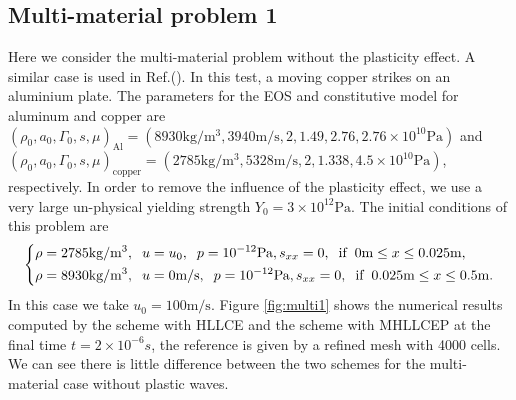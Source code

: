 \documentclass[review]{elsarticle}
\begin{document}
    \subsection{Multi-material problem 1}\label{pro:multi1}
  Here we consider the multi-material problem without the plasticity effect. A similar case is used in Ref.(\cite{ghaisas2016high}). In this test, a moving  copper strikes on an aluminium plate. The parameters for the EOS and constitutive model for aluminum and copper  are
$ (\rho_0, a_0, \Gamma_0, s, \mu)_{\text{Al}} =(8930 \text{kg}/\text{m}^3, 3940 \text{m}/\text{s},2, 1.49, 2.76 ,2.76\times 10^{10} \text{Pa} )$ and   $(\rho_0, a_0, \Gamma_0, s, \mu)_{\text{copper}} =(2785 \text{kg}/\text{m}^3, 5328 \text{m}/\text{s},2, 1.338,4.5\times 10^{10}\text{Pa})$, respectively. In order to remove the influence of the plasticity effect, we use a very large un-physical yielding strength $Y_0 = 3\times 10^{12} \text{Pa}$.  The initial conditions of this problem are
\begin{equation}\label{eq:initmulti}
  \left\{ \begin{aligned}
    & \rho = 2785 \text{kg}/\text{m}^3, \hspace{0.2cm} u = u_0, \hspace{0.2cm} p = 10^{-12}\text{Pa}, s_{xx} = 0, \hspace{0.2cm} \text{if} \hspace{0.2cm} 0\text{m} \le x \le 0.025 \text{m},\\
    &  \rho = 8930 \text{kg}/\text{m}^3, \hspace{0.2cm} u = 0\text{m}/\text{s}, \hspace{0.2cm} p = 10^{-12}\text{Pa}, s_{xx} = 0, \hspace{0.2cm} \text{if} \hspace{0.2cm} 0.025\text{m} \le x \le 0.5 \text{m}.\\
    \end{aligned}
  \right.
\end{equation}
In this case we take $u_0 = 100 \text{m}/\text{s}$. Figure \ref{fig:multi1}  shows  the numerical results computed by the scheme with HLLCE and the scheme with MHLLCEP at the final time $ t= 2 \times 10^{-6}s$, the reference is given by a refined mesh  with 4000 cells.  We can see there is little difference between the two schemes  for  the multi-material case without plastic waves.
\end{document}
